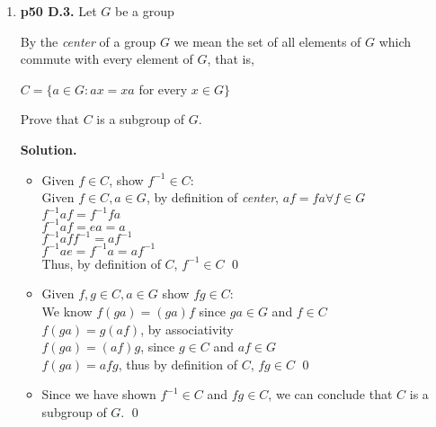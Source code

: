 \documentclass[11pt]{article}
\begin{document}
\begin{enumerate}
  For $x,y \in H \cap K$, we know $x,y \in H$ and $x,y \in K$ \\
  Since $H$ and $K$ are subgroups, they are closed under their operation. Thus $xy \in H$ and $xy \in K$ \\
  Thus $xy \in H \cap K$. \qed \\
  
  Since we have shown $x^{-1} \in H \cap K$ and $xy \in H \cap K$, we can conclude that $H \cap K$ is a subgroup of $G$. \qed \\

\item {\bfseries p50 D.3.} Let $G$ be a group
  
  By the \textit{center} of a group $G$ we mean the set of all elements of $G$ which commute with every element of $G$, that is,
  
  $C = \{ a \in G : ax = xa$ for every $x \in G\}$
  
  Prove that $C$ is a subgroup of $G$.
  
  {\bfseries Solution.}
  
  \begin{itemize}
	  \item Given $f \in C$, show $f^{-1} \in C$: \\
	  Given $f \in C, a \in G$, by definition of \textit{center}, $af = fa \forall f \in G$ \\
	  $f^{-1}af = f^{-1}fa$ \\
	  $f^{-1}af = ea = a$ \\
	  $f^{-1}aff^{-1} = af^{-1}$ \\
	  $f^{-1}ae = f^{-1}a = af^{-1}$ \\
	  Thus, by definition of $C$, $f^{-1} \in C$ \qed \\
	  
	  \item Given $f,g \in C, a \in G$ show $fg \in C$: \\
	  We know $f(ga) = (ga)f$ since $ga \in G$ and $f \in C$ \\
	  $f(ga) = g(af)$, by associativity \\
	  $f(ga) = (af)g$, since $g \in C$ and $af \in G$ \\
	  $f(ga) = afg$, thus by definition of $C$, $fg \in C$ \qed \\
	  
	  \item Since we have shown $f^{-1} \in C$ and $fg \in C$, we can conclude that $C$ is a subgroup of $G$. \qed
  
  \end{itemize}


\end{enumerate}
\end{document}
